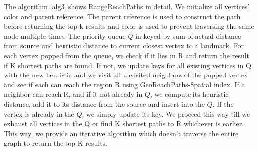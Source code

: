 {The algorithm \ref{alg3} shows RangeReachPaths in detail. We initialize all vertices' color and parent reference. The parent reference is used to construct the path before returning the top-k results and color is used to prevent traversing the same node multiple times. The priority queue $Q$ in keyed by sum of actual distance from source and heuristic distance to current closest vertex to a landmark. For each vertex popped from the queue, we check if it lies in R and return the result if K shortest paths are found. If not, we update keys for all existing vertices in Q with the new heuristic and we visit all unvisited neighbors of the popped vertex and see if each can reach the region R using GeoReachPaths-Spatial index. If a neighbor can reach R, and if it not already in $Q$, we compute its heuristic distance, add it to its distance from the source and insert into the $Q$. If the vertex is already in the $Q$, we simply update its key. We proceed this way till we exhaust all vertices in the Q or find K shortest paths to R whichever is earlier. This way, we provide an iterative algorithm which doesn't traverse the entire graph to return the top-K results.

		
		

}
